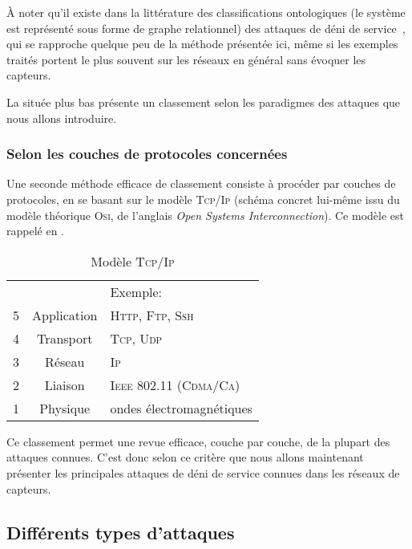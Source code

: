 À noter qu'il existe dans la littérature des classifications ontologiques (le système est représenté sous forme de graphe relationnel) des attaques de déni de service~\cite{VS10}, qui se rapproche quelque peu de la méthode présentée ici, même si les exemples traités portent le plus souvent sur les réseaux en général sans évoquer les capteurs.

La  située plus bas présente un classement selon les paradigmes des attaques que nous allons introduire.

\subsubsection{Selon les couches de protocoles concernées}
Une seconde méthode efficace de classement consiste à procéder par couches de protocoles, en se basant sur le modèle \textsc{Tcp/Ip} (schéma concret lui-même issu du modèle théorique \textsc{Osi}, de l'anglais \textit{Open Systems Interconnection}).
Ce modèle est rappelé en .
\begin{table}[!ht]
    \centering
    \begin{tabular}{c |c| l}
        \multicolumn{2}{c}{} & Exemple:\\
        \cline{2-2}
        5 & Application & \textsc{Http, Ftp, Ssh}\\
        \cline{2-2}
        4 & Transport & \textsc{Tcp, Udp}\\
        \cline{2-2}
        3 & Réseau & \textsc{Ip}\\
        \cline{2-2}
        2 & Liaison & \textsc{Ieee 802.11 (Cdma/Ca)}\\
        \cline{2-2}
        1 & Physique & ondes électromagnétiques\\
        \cline{2-2}
     \end{tabular}
    \medskip
    \caption{Modèle \textsc{Tcp/Ip}}\label{ea:fig:tcpip}
\end{table}

Ce classement permet une revue efficace, couche par couche, de la plupart des attaques connues.
C'est donc selon ce critère que nous allons maintenant présenter les principales attaques de déni de service connues dans les réseaux de capteurs.

\subsection{Différents types d'attaques}

